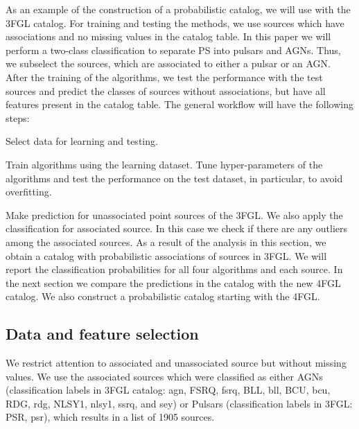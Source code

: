 As an example of the construction of a probabilistic catalog, we will use with the 3FGL catalog.
For training and testing the methods, we use sources which have associations and no missing values in the catalog table.
In this paper we will perform a two-class classification to separate PS into pulsars and AGNs.
Thus, we subselect the sources, which are associated to either a pulsar or an AGN.
After the training of the algorithms, we test the performance with the test sources and predict the classes of sources without associations,
but have all features present in the catalog table.
The general workflow will have the following steps:
\ben
\item
Select data for learning and testing.
\item
Train algorithms using the learning dataset.
Tune hyper-parameters of the algorithms and test the performance on the test dataset, in particular, to avoid overfitting.
\item
Make prediction for unassociated point sources of the 3FGL.
We also apply the classification for associated source. In this case we check if there are any outliers among the associated sources.
\een
As a result of the analysis in this section, we obtain a catalog with probabilistic associations of sources in 3FGL.
We will report the classification probabilities for all four algorithms and each source.
In the next section we compare the predictions in the catalog with the new 4FGL catalog.
We also construct a probabilistic catalog starting with the 4FGL.


\subsection{Data and feature selection}

We restrict attention to associated and unassociated source but without missing values. 
We use the associated sources which were classified as either AGNs (classification labels in 3FGL catalog: agn, FSRQ, fsrq, BLL, bll, BCU, bcu, RDG, rdg, NLSY1, nlsy1, ssrq, and sey) or Pulsars (classification labels in 3FGL: PSR, psr), which results in a list of 1905 sources. 

